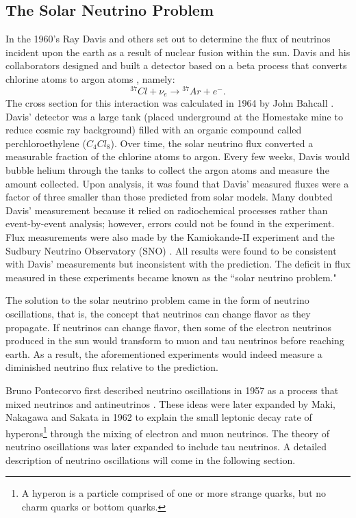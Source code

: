 \subsection{The Solar Neutrino Problem}

In the 1960's Ray Davis and others set out to determine the flux of neutrinos incident upon the earth as a result of nuclear fusion within the sun.  Davis and his collaborators designed and built a detector based on a beta process  that converts chlorine atoms to argon atoms , namely: 
\begin{equation}\label{nuChlorCap}
{}^{37}Cl + \nu_e  \rightarrow {}^{37}Ar + e^-. 
\end{equation}
The cross section for this interaction was calculated in 1964 by John Bahcall \cite{bahcall}.  Davis' detector was a large tank (placed underground at the Homestake mine to reduce cosmic ray background) filled with an organic compound called perchloroethylene ($C_4Cl_8$).  \cite{davis}  Over time, the solar neutrino flux converted a measurable fraction of the chlorine atoms to argon.  Every few weeks, Davis would bubble helium through the tanks to collect the argon atoms and measure the amount collected.  Upon analysis, it was found that Davis' measured fluxes were a factor of three smaller than those predicted from solar models.  Many doubted Davis' measurement because it relied on radiochemical processes rather than event-by-event analysis; however, errors could not be found in the experiment.  Flux measurements were also made by the Kamiokande-II experiment and the Sudbury Neutrino Observatory (SNO) \cite{kamiokande, sno}.  All results were found to be consistent with Davis' measurements but inconsistent with the prediction.  The deficit in flux measured in these experiments became known as the ``solar neutrino problem."

The solution to the solar neutrino problem came in the form of neutrino oscillations, that is, the concept that neutrinos can change flavor as they propagate.  If neutrinos can change flavor, then some of the electron neutrinos produced in the sun would transform to muon and tau neutrinos before reaching earth.  As a result, the aforementioned experiments would indeed measure a diminished neutrino flux relative to the prediction.  

Bruno Pontecorvo first described neutrino oscillations in 1957 as a process that mixed neutrinos and antineutrinos  \cite{pontecorvo}.  These ideas were later expanded by Maki, Nakagawa and Sakata in 1962 to explain the small leptonic decay rate of hyperons\footnote{A hyperon is a particle comprised of one or more strange quarks, but no charm quarks or bottom quarks.} through the mixing of electron and muon neutrinos.  The theory of neutrino oscillations was later expanded to include tau neutrinos.  A detailed description of neutrino oscillations will come in the following section.

